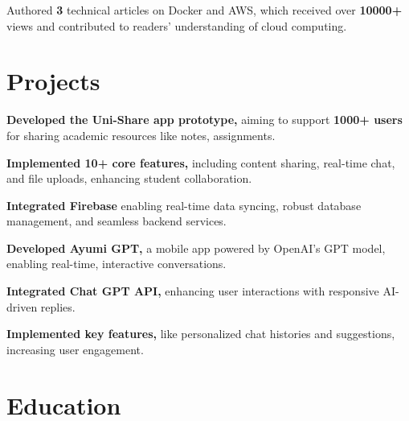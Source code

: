 \documentclass[]{deedy-resume-openfont}
\begin{document}
\hfill {}
\begin{tightemize}
	\item Authored \textbf{3} technical articles on Docker and AWS, which received over \textbf{10000+} views and contributed to readers' understanding of cloud computing.
\end{tightemize}
\sectionsep


\section{Projects}

\hfill {}
\vspace{1.7mm}
\begin{tightemize}
	\item \textbf{Developed the Uni-Share app prototype,} aiming to support \textbf{1000+ users} for sharing academic resources like notes, assignments.
    \vspace{-1.7mm}
	\item \textbf{Implemented 10+ core features,} including content sharing, real-time chat, and file uploads, enhancing student collaboration.
    \vspace{-1.7mm}
    \item \textbf{Integrated Firebase} enabling real-time data syncing, robust database management, and seamless backend services.
\end{tightemize}
\sectionsep

\vspace{1.7mm}
\begin{tightemize}
    \item \textbf{Developed Ayumi GPT,} a mobile app powered by OpenAI’s GPT model, enabling real-time, interactive conversations.    
    \vspace{-1.7mm}
    \item \textbf{Integrated Chat GPT API,} enhancing user interactions with responsive AI-driven replies.
    \vspace{-1.7mm}
	\item \textbf{Implemented key features,} like personalized chat histories and suggestions, increasing user engagement.
\end{tightemize}
\sectionsep

\section{Education}
\hfill {}
\sectionsep

\hfill {}
\sectionsep

\
\hfill {}
\sectionsep
\end{document}
